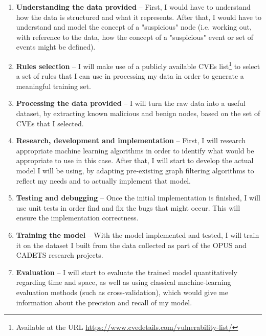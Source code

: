 \begin{enumerate}

	\item \textbf{Understanding the data provided} -- First, I would have to understand how the data is structured and what it represents. After that, I would have to understand and model the concept of a "suspicious" node (i.e. working out, with reference to the data, how the concept of a "suspicious" event or set of events might be defined). 
	
	\item \textbf{Rules selection} -- I will make use of a publicly available CVEs list\footnote{Available at the URL \url{https://www.cvedetails.com/vulnerability-list/}}
	to select a set of rules that I can use in processing my data in order to generate a meaningful training set.
	
	\item \textbf{Processing the data provided} -- I will turn the raw data into a useful dataset, by extracting known malicious and benign nodes, based on the set of CVEs that I selected. 
	
	\item \textbf{Research, development and implementation} -- First, I will research appropriate machine learning  algorithms in order to identify what would be appropriate to use in this case. After that, I will start to develop the actual model I will be using, by adapting pre-existing graph filtering algorithms to reflect my needs and to actually implement that model. 
	
	\item \textbf{Testing and debugging} -- Once the initial implementation is finished, I will use unit tests in order find and fix the bugs that might occur. This will ensure the implementation correctness. 
	
	\item \textbf{Training the model} -- With the model implemented and tested, I will train it on the dataset I built from the data collected as part of the OPUS and CADETS research projects.
		
	\item \textbf{Evaluation} -- I will start to evaluate the trained model quantitatively regarding time and space, as well as using classical machine-learning evaluation methods (such as cross-validation), which would give me information about the precision and recall of my model.
	
\end{enumerate}


